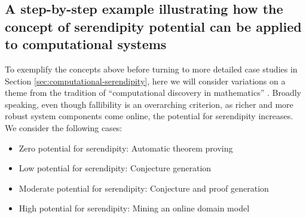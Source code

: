   


\subsection{A step-by-step example illustrating how the concept of serendipity potential can be applied to computational systems} \label{sec:by-example-summary}

To exemplify the concepts above before turning to more detailed case studies in Section \ref{sec:computational-serendipity}, here we will consider variations on a theme from the tradition of ``computational
discovery in mathematics'' \cite{colton2007computational}.  Broadly speaking, even though fallibility is an overarching criterion, as richer and more robust system components come online, the potential for serendipity increases.  We consider the following cases:

\begin{itemize}
\item Zero potential for serendipity: Automatic theorem proving
\item Low potential for serendipity: Conjecture generation
\item Moderate potential for serendipity: Conjecture and proof generation
\item High potential for serendipity: Mining an online domain model
\end{itemize}

